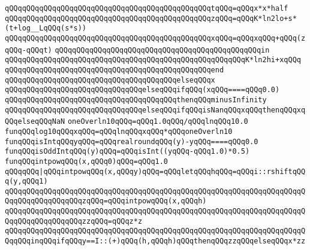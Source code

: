 \verb|qQQqqQQqqQQqqQQqqQQqqQQqqQQqqQQqqQQqqQQqqQQqqQQqtqQQq=qQQqx*x*half|\newline
\verb|qQQqqQQqqQQqqQQqqQQqqQQqqQQqqQQqqQQqqQQqqQQqqQQqzqQQq=qQQqK*ln2lo+s*(t+log__LqQQq(s*s))|\newline
\verb|qQQqqQQqqQQqqQQqqQQqqQQqqQQqqQQqqQQqqQQqqQQqqQQqxqQQq=qQQqxqQQq+qQQq(zqQQq-qQQqt)|\newline
\verb|qQQqqQQqqQQqqQQqqQQqqQQqqQQqqQQqqQQqqQQqqQQqqQQqin|\newline
\verb|qQQqqQQqqQQqqQQqqQQqqQQqqQQqqQQqqQQqqQQqqQQqqQQqqQQqqQQqK*ln2hi+xqQQq|\newline
\verb|qQQqqQQqqQQqqQQqqQQqqQQqqQQqqQQqqQQqqQQqqQQqqQQqend|\newline
\verb|qQQqqQQqqQQqqQQqqQQqqQQqqQQqqQQqqQQqqQQqelseqQQqx|\newline
\verb|qQQqqQQqqQQqqQQqqQQqqQQqqQQqqQQqelseqQQqifqQQq(xqQQq====qQQq0.0)|\newline
\verb|qQQqqQQqqQQqqQQqqQQqqQQqqQQqqQQqqQQqqQQqthenqQQqminusInfinity|\newline
\verb|qQQqqQQqqQQqqQQqqQQqqQQqqQQqqQQqelseqQQqifqQQqisNanqQQqxqQQqthenqQQqxqQQqelseqQQqNaN|\newline
\newline
\verb|oneOverln10qQQq=qQQq1.0qQQq/qQQqlnqQQq10.0|\newline
\newline
\verb|funqQQqlog10qQQqxqQQq=qQQqlnqQQqxqQQq*qQQqoneOverln10|\newline
\newline
\verb|funqQQqisIntqQQqyqQQq=qQQqrealroundqQQq(y)-yqQQq====qQQq0.0|\newline
\verb|funqQQqisOddIntqQQq(y)qQQq=qQQqisInt((yqQQq-qQQq1.0)*0.5)|\newline
\newline
\verb|funqQQqintpowqQQq(x,qQQq0)qQQq=qQQq1.0|\newline
\verb|qQQqqQQq|\verb#|qQQqintpowqQQq(x,qQQqy)qQQq=qQQqletqQQqhqQQq=qQQqi::rshiftqQQq(y,qQQq1)#\newline
\verb|qQQqqQQqqQQqqQQqqQQqqQQqqQQqqQQqqQQqqQQqqQQqqQQqqQQqqQQqqQQqqQQqqQQqqQQqqQQqqQQqqQQqqQQqzqQQq=qQQqintpowqQQq(x,qQQqh)|\newline
\verb|qQQqqQQqqQQqqQQqqQQqqQQqqQQqqQQqqQQqqQQqqQQqqQQqqQQqqQQqqQQqqQQqqQQqqQQqqQQqqQQqqQQqqQQqzzqQQq=qQQqz*z|\newline
\verb|qQQqqQQqqQQqqQQqqQQqqQQqqQQqqQQqqQQqqQQqqQQqqQQqqQQqqQQqqQQqqQQqqQQqqQQqqQQqinqQQqifqQQqy==I::(+)qQQq(h,qQQqh)qQQqthenqQQqzzqQQqelseqQQqx*zz|\newline
